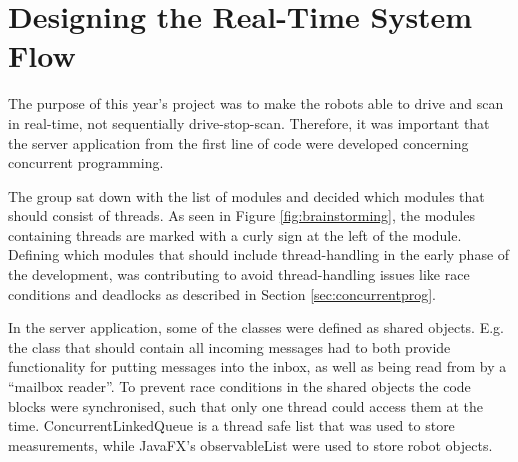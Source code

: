 \section{Designing the Real-Time System Flow}
The purpose of this year's project was to make the robots able to drive and scan in real-time, not sequentially drive-stop-scan. Therefore, it was important that the server application from the first line of code were developed concerning concurrent programming.

The group sat down with the list of modules and decided which modules that should consist of threads. As seen in Figure \ref{fig:brainstorming}, the modules containing threads are marked with a curly sign at the left of the module. Defining which modules that should include thread-handling in the early phase of the development, was contributing to avoid thread-handling issues like race conditions and deadlocks as described in Section \ref{sec:concurrentprog}.

In the server application, some of the classes were defined as shared objects. E.g. the class that should contain all incoming messages had to both provide functionality for putting messages into the inbox, as well as being read from by a ``mailbox reader''. To prevent race conditions in the shared objects the code blocks were synchronised, such that only one thread could access them at the time. ConcurrentLinkedQueue is a thread safe list that was used to store measurements, while JavaFX's observableList were used to store robot objects.